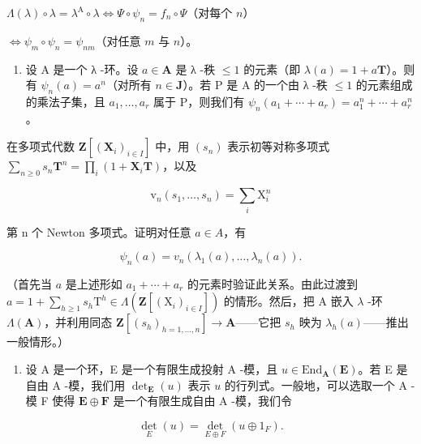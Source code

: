 \(\Lambda (\lambda)\circ \lambda = \lambda^{\mathrm{A}}\circ \lambda \Leftrightarrow \Psi \circ \psi_{n} = f_{n}\circ \Psi\)（对每个 \(n\)）

\(\Leftrightarrow \psi_{m} \circ \psi_{n} = \psi_{nm}\)（对任意 \(m\) 与 \(n\)）。

\begin{enumerate}
\def\labelenumi{\alph{enumi})}
\setcounter{enumi}{3}
\tightlist
\item
  设 A 是一个 λ -环。设 \(a \in \mathbf{A}\) 是 λ -秩 \(\leqslant 1\) 的元素（即 \(\lambda(a) = 1 + a\mathbf{T}\)）。则有 \(\psi_n(a) = a^n\)（对所有 \(n \in \mathbf{J}\)）。若 P 是 A 的一个由 λ -秩 \(\leqslant 1\) 的元素组成的乘法子集，且 \(a_1, \ldots, a_r\) 属于 P，则我们有 \(\psi_n(a_1 + \cdots + a_r) = a_1^n + \cdots + a_r^n\)。
\end{enumerate}

在多项式代数 \(\mathbf{Z}[(\mathbf{X}_{i})_{i\in I}]\) 中，用 \((s_{n})\) 表示初等对称多项式 \(\sum_{n\geq0}s_{n}\mathbf{T}^{n}=\prod_{i}(1+\mathbf{X}_{i}\mathbf{T})\)，以及

\[
\mathrm{v} _ {n} (s _ {1}, \dots , s _ {n}) = \sum_ {i} \mathrm{X} _ {i} ^ {n}
\]

第 n 个 Newton 多项式。证明对任意 \(a \in A\)，有

\[
\psi_ {n} (a) = v _ {n} \left(\lambda_ {1} (a), \dots , \lambda_ {n} (a)\right).
\]

（首先当 \(a\) 是上述形如 \(a_{1} + \cdots + a_{r}\) 的元素时验证此关系。由此过渡到 \(a = 1 + \sum_{h \geqslant 1} s_{h} \mathrm{T}^{h} \in \Lambda(\mathbf{Z}[(\mathrm{X}_{i})_{i \in I}])\) 的情形。然后，把 A 嵌入 \(\lambda\) -环 \(\Lambda(\mathbf{A})\)，并利用同态 \(\mathbf{Z}[(s_{h})_{h=1,\ldots,n}] \to \mathbf{A}\)——它把 \(s_{h}\) 映为 \(\lambda_{h}(a)\)——推出一般情形。）

\begin{enumerate}
\def\labelenumi{\arabic{enumi})}
\setcounter{enumi}{48}
\tightlist
\item
  设 A 是一个环，E 是一个有限生成投射 A -模，且 \(u \in \text{End}_{\mathbf{A}}(\mathbf{E})\)。若 E 是自由 A -模，我们用 \(\det_{\mathbf{E}}(u)\) 表示 \(u\) 的行列式。一般地，可以选取一个 A -模 F 使得 \(\mathbf{E} \oplus \mathbf{F}\) 是一个有限生成自由 A -模，我们令
\end{enumerate}

\[
\det _ {E} (u) = \det _ {E \oplus F} (u \oplus 1 _ {F}).
\]

